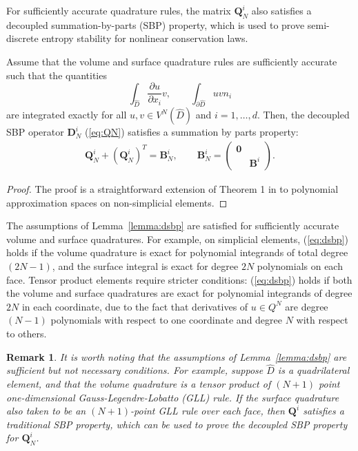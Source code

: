 \documentclass[review]{siamart0216}
\newtheorem*{remark}{Remark}
\theoremstyle{assumption}
\renewcommand{\hat}[1]{\hat{#1}}
\newcommand{\pd}[2]{\frac{\partial#1}{\partial#2}}
\newcommand{\LRp}[1]{\left( #1 \right)}
\renewcommand{\hat}{\widehat}
\begin{document}
For sufficiently accurate quadrature rules, the matrix $\bm{Q}^i_N$ also satisfies a decoupled summation-by-parts (SBP) property, which is used to prove semi-discrete entropy stability for nonlinear conservation laws.  
\begin{lemma}
Assume that the volume and surface quadrature rules are sufficiently accurate such that the quantities
\[
\int_{\hat{D}} \pd{u}{x_i} v, \qquad \int_{\partial \hat{D}} u v n_i
\]
are integrated exactly for all $u,v \in V^N\LRp{\hat{D}}$ and $i = 1,\ldots, d$.  Then, the decoupled SBP operator $\bm{D}^i_N$ (\ref{eq:QN}) satisfies a summation by parts property:
\begin{gather}
\bm{Q}^i_N+\LRp{\bm{Q}^i_N}^T = \bm{B}^i_N, \qquad \bm{B}^i_N = \LRp{\begin{array}{cc}\bm{0}&\\ & \bm{B}^i\end{array}}.\label{eq:dsbp}
\end{gather}
\label{lemma:dsbp}
\end{lemma}
\begin{proof}
The proof is a straightforward extension of Theorem 1 in \cite{chan2017discretely} to polynomial approximation spaces on non-simplicial elements.  
\end{proof}

The assumptions of Lemma~\ref{lemma:dsbp} are satisfied for sufficiently accurate volume and surface quadratures.  For example, on simplicial elements, (\ref{eq:dsbp}) holds if the volume quadrature is exact for polynomial integrands of total degree $(2N-1)$, and the surface integral is exact for degree $2N$ polynomials on each face.  Tensor product elements require stricter conditions: (\ref{eq:dsbp}) holds if both the volume and surface quadratures are exact for polynomial integrands of degree $2N$ in each coordinate, due to the fact that derivatives of $u\in Q^N$ are degree $(N-1)$ polynomials with respect to one coordinate and degree $N$ with respect to others.  

\begin{remark}
It is worth noting that the assumptions of Lemma~\ref{lemma:dsbp} are sufficient but not necessary conditions.  For example, suppose $\hat{D}$ is a quadrilateral element, and that the volume quadrature is a tensor product of $(N+1)$ point one-dimensional Gauss-Legendre-Lobatto (GLL) rule.  If the surface quadrature also taken to be an $(N+1)$-point GLL rule over each face, then $\bm{Q}^i$ satisfies a traditional SBP property, which can be used to prove the decoupled SBP property for $\bm{Q}^i_N$.  
\end{remark}
\end{document}
